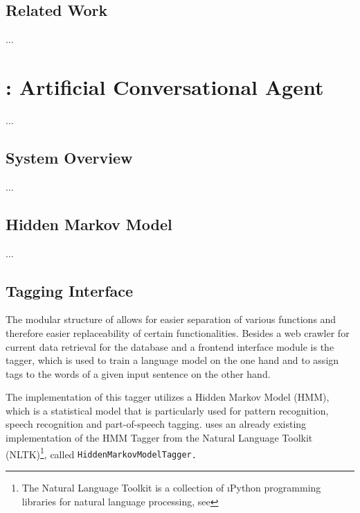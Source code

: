 

\section{Related Work}\label{c.introduction.related}
...

\chapter{\Alex: Artificial Conversational Agent}\label{c.alex}
...

\section{System Overview}\label{c.alex.overview}
...

\section{Hidden Markov Model}\label{c.alex.hmm}
...

\section{Tagging Interface}\label{c.alex.tagging}
The modular structure of \Alex allows for easier separation of various functions and therefore easier replaceability of certain functionalities. Besides a web crawler for current data retrieval for the database and a frontend interface module is the tagger, which is used to train a language model on the one hand and to assign tags to the words of a given input sentence on the other hand.

The implementation of this tagger utilizes a Hidden Markov Model (HMM), which is a statistical model that is particularly used for pattern recognition, speech recognition and part-of-speech tagging. \Alex uses an already existing implementation of the HMM Tagger from the Natural Language Toolkit (NLTK)\footnote{The Natural Language Toolkit is a collection of \i{Python} programming libraries for natural language processing, see }, called \tt{HiddenMarkovModelTagger}.

